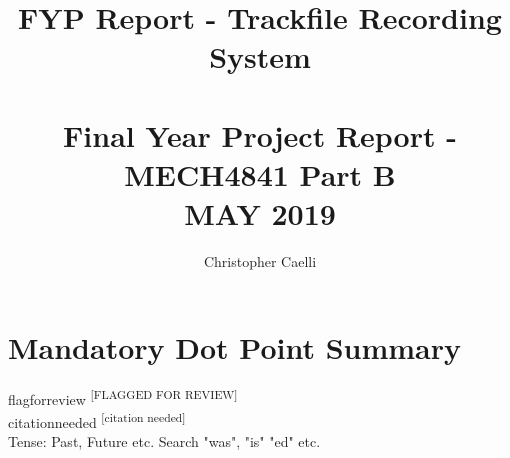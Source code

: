 \documentclass{UoNMCHA}
\newcommand{\citationneeded}{\textsuperscript{\color{blue} [citation needed]}}
\newcommand{\flagforreview}{\textsuperscript{\color{red} [FLAGGED FOR REVIEW]}}
\numberwithin{equation}{section}
\begin{document}
\title{FYP Report - Trackfile Recording System \\ \ \\
{\small Final Year Project Report - MECH4841 Part B  \\MAY 2019}}
\author[UoNMCHA]{Christopher Caelli}
\address[UoNMCHA]{
Student of Mechatronics Engineering,\\
The University of Newcastle, Callaghan, NSW 2308, AUSTRALIA \\
Student Number: 3206246 \\
E-mail: \href{mailto:Christopher.Caelli@uon.edu.au}{\textsf{Christopher.Caelli@uon.edu.au}}}
\maketitle
\onecolumn

\vspace{-5mm}
\section*{Mandatory Dot Point Summary}
\vspace{-3mm}

flagforreview \flagforreview \\
citationneeded \citationneeded \\
Tense: Past, Future etc. Search "was", "is" "ed" etc.
\end{document}

